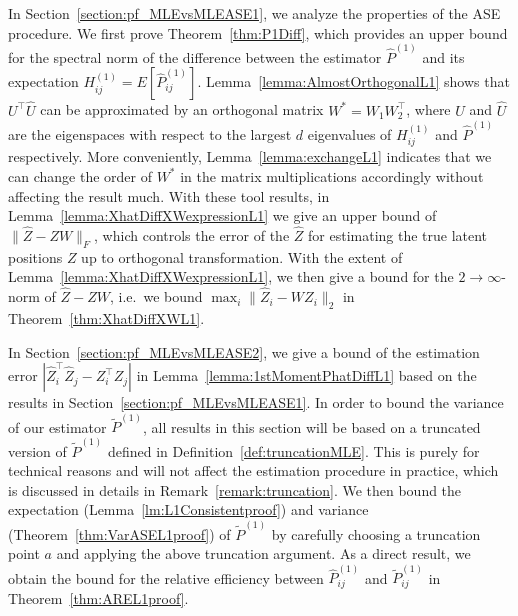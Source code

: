 \documentclass[a4paper]{article}
\renewcommand{\hat}{\widehat}
\begin{document}
In Section~\ref{section:pf_MLEvsMLEASE1}, we analyze the properties of the ASE procedure. We first prove Theorem~\ref{thm:P1Diff}, which provides an upper bound for the spectral norm of the difference between the estimator $\hat{P}^{(1)}$ and its expectation $H_{ij}^{(1)} = E[\hat{P}_{ij}^{(1)}]$. Lemma~\ref{lemma:AlmostOrthogonalL1} shows that $U^{\top} \hat{U}$ can be approximated by an orthogonal matrix $W^{*} = W_1 W_2^{\top}$, where $U$ and $\hat{U}$ are the eigenspaces with respect to the largest $d$ eigenvalues of $H_{ij}^{(1)}$ and $\hat{P}^{(1)}$ respectively. More conveniently, Lemma~\ref{lemma:exchangeL1} indicates that we can change the order of $W^*$ in the matrix multiplications accordingly without affecting the result much. With these tool results, in Lemma~\ref{lemma:XhatDiffXWexpressionL1} we give an upper bound of $\|\hat{Z} - Z W\|_F$, which controls the error of the $\hat{Z}$ for estimating the true latent positions $Z$ up to orthogonal transformation.
With the extent of Lemma~\ref{lemma:XhatDiffXWexpressionL1}, we then give a bound for the $2 \to \infty$-norm of $\hat{Z} - Z W$, i.e.\ we bound $\max_i \| \hat{Z}_i - W Z_i \|_2$ in Theorem~\ref{thm:XhatDiffXWL1}.

In Section~\ref{section:pf_MLEvsMLEASE2}, we give a bound of the estimation error $\left|  \hat{Z}_i^{\top} \hat{Z}_j - Z_i^{\top} Z_j \right|$ in Lemma~\ref{lemma:1stMomentPhatDiffL1} based on the results in Section~\ref{section:pf_MLEvsMLEASE1}. In order to bound the variance of our estimator $\widetilde{P}^{(1)}$, all results in this section will be based on a truncated version of $\widetilde{P}^{(1)}$ defined in Definition~\ref{def:truncationMLE}. This is purely for technical reasons and will not affect the estimation procedure in practice, which is discussed in details in Remark~\ref{remark:truncation}. We then bound the expectation (Lemma~\ref{lm:L1Consistentproof}) and variance (Theorem~\ref{thm:VarASEL1proof}) of $\widetilde{P}^{(1)}$ by carefully choosing a truncation point $a$ and applying the above truncation argument. As a direct result, we obtain the bound for the relative efficiency between $\hat{P}_{ij}^{(1)}$ and $\widetilde{P}_{ij}^{(1)}$ in Theorem~\ref{thm:AREL1proof}.
\end{document}
